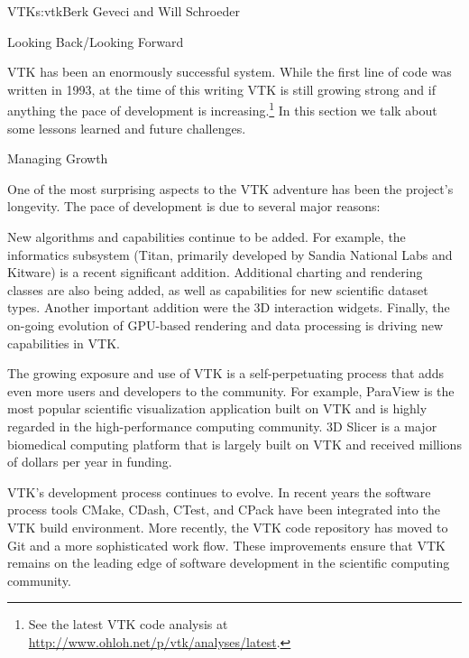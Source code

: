 \begin{aosachapter}{VTK}{s:vtk}{Berk Geveci and Will Schroeder}
\begin{aosasect1}{Looking Back/Looking Forward}

VTK has been an enormously successful system. While the first line of code was written in
1993, at the time of this writing VTK is still growing strong and if anything
the pace of development is increasing.\footnote{See the latest VTK code
analysis at \url{http://www.ohloh.net/p/vtk/analyses/latest}.} In this section
we talk about some lessons learned and future challenges.

\begin{aosasect2}{Managing Growth}

One of the most surprising aspects to the VTK adventure has been the
project's longevity. The pace of development is due to several major
reasons:

\begin{aosaitemize}

  \item New algorithms and capabilities continue to be added. For
  example, the informatics subsystem (Titan, primarily developed by
  Sandia National Labs and Kitware) is a recent significant
  addition. Additional charting and rendering classes are also being
  added, as well as capabilities for new scientific dataset
  types. Another important addition were the 3D interaction
  widgets. Finally, the on-going evolution of GPU-based rendering and
  data processing is driving new capabilities in VTK.

  \item The growing exposure and use of VTK is a self-perpetuating
  process that adds even more users and developers to the
  community. For example, ParaView is the most popular scientific
  visualization application built on VTK and is highly regarded in the
  high-performance computing community. 3D Slicer is a major
  biomedical computing platform that is largely built on VTK and
  received millions of dollars per year in funding.

  \item VTK's development process continues to evolve. In recent years
  the software process tools CMake, CDash, CTest, and CPack have been
  integrated into the VTK build environment. More recently, the VTK
  code repository has moved to Git and a more sophisticated work
  flow. These improvements ensure that VTK remains on the leading edge
  of software development in the scientific computing community.

\end{aosaitemize}


\end{aosasect2}
\end{aosasect1}
\end{aosachapter}
